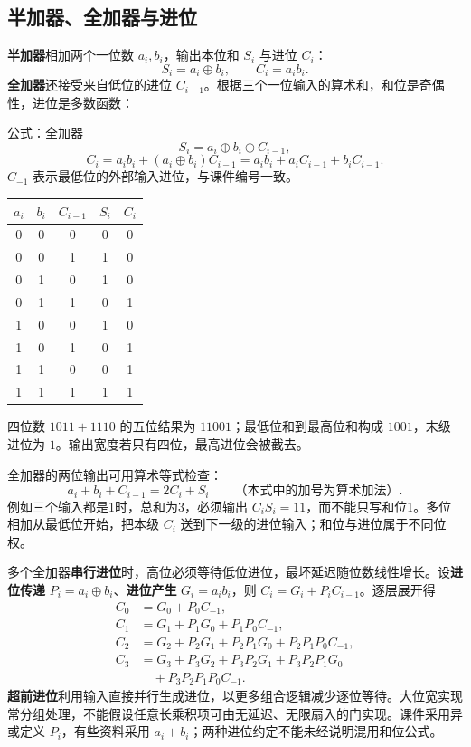 \documentclass[UTF8,fontset=none,zihao=-4,a4paper]{ctexart}
\newcommand{\term}[1]{\textbf{#1}}
\begin{document}
\subsection{半加器、全加器与进位}
\term{半加器}相加两个一位数 $a_i,b_i$，输出本位和 $S_i$ 与进位 $C_i$：
\[
S_i=a_i\oplus b_i,\qquad C_i=a_ib_i.
\]
\term{全加器}还接受来自低位的进位 $C_{i-1}$。根据三个一位输入的算术和，和位是奇偶性，进位是多数函数：
\begin{infobox}{公式：全加器}
\[
S_i=a_i\oplus b_i\oplus C_{i-1},
\]
\[
C_i=a_ib_i+(a_i\oplus b_i)C_{i-1}
=a_ib_i+a_iC_{i-1}+b_iC_{i-1}.
\]
$C_{-1}$ 表示最低位的外部输入进位，与课件编号一致。
\end{infobox}
\begin{center}
\begin{tabular}{ccc cc}
\toprule $a_i$&$b_i$&$C_{i-1}$&$S_i$&$C_i$\\\midrule
0&0&0&0&0\\0&0&1&1&0\\0&1&0&1&0\\0&1&1&0&1\\
1&0&0&1&0\\1&0&1&0&1\\1&1&0&0&1\\1&1&1&1&1\\\bottomrule
\end{tabular}
\end{center}
四位数 $1011+1110$ 的五位结果为 $11001$；最低位和到最高位和构成 $1001$，末级进位为 $1$。输出宽度若只有四位，最高进位会被截去。

全加器的两位输出可用算术等式检查：
\[
a_i+b_i+C_{i-1}=2C_i+S_i\qquad\text{（本式中的加号为算术加法）}.
\]
例如三个输入都是1时，总和为3，必须输出 $C_iS_i=11$，而不能只写和位1。多位相加从最低位开始，把本级 $C_i$ 送到下一级的进位输入；和位与进位属于不同位权。

多个全加器\term{串行进位}时，高位必须等待低位进位，最坏延迟随位数线性增长。设\term{进位传递} $P_i=a_i\oplus b_i$、\term{进位产生} $G_i=a_ib_i$，则 $C_i=G_i+P_iC_{i-1}$。逐层展开得
\begin{align*}
C_0&=G_0+P_0C_{-1},\\
C_1&=G_1+P_1G_0+P_1P_0C_{-1},\\
C_2&=G_2+P_2G_1+P_2P_1G_0+P_2P_1P_0C_{-1},\\
C_3&=G_3+P_3G_2+P_3P_2G_1+P_3P_2P_1G_0\\
&\quad+P_3P_2P_1P_0C_{-1}.
\end{align*}
\term{超前进位}利用输入直接并行生成进位，以更多组合逻辑减少逐位等待。大位宽实现常分组处理，不能假设任意长乘积项可由无延迟、无限扇入的门实现。课件采用异或定义 $P_i$，有些资料采用 $a_i+b_i$；两种进位约定不能未经说明混用和位公式。
\end{document}

